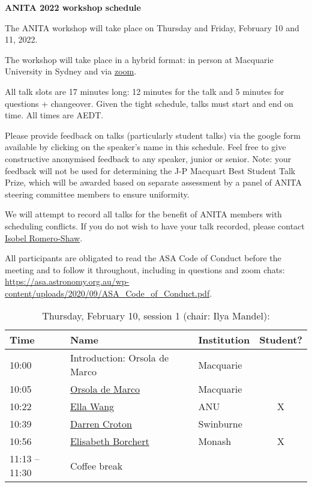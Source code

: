 \documentclass[amsmath,onecolumn]{revtex4-1}
\begin{document}
\begin{center}
{\bf ANITA 2022 workshop schedule}\\
\end{center}
\vspace{0.2in}

The ANITA workshop will take place on Thursday and Friday, February 10 and 11, 2022.

The workshop will take place in a hybrid format: in person at Macquarie University in Sydney and via \href{https://uni-sydney.zoom.us/j/83045235112}{zoom}.  %

All talk slots are 17 minutes long: 12 minutes for the talk and 5 minutes for questions + changeover.  Given the tight schedule, talks must start and end on time.  All times are AEDT.

Please provide feedback on talks (particularly student talks) via the google form available by clicking on the speaker's name in this schedule.  Feel free to give constructive anonymised feedback to any speaker, junior or senior.  Note: your feedback will not be used for determining the J-P Macquart Best Student Talk Prize, which will be awarded based on separate assessment by a panel of ANITA steering committee members to ensure uniformity.

We will attempt to record all talks for the benefit of ANITA members with scheduling conflicts.  If you do not wish to have your talk recorded, please contact \href{mailto:isobel.romero-shaw@monash.edu}{Isobel Romero-Shaw}.

All participants are obligated to read the ASA Code of Conduct before the meeting and to follow it throughout, including in questions and zoom chats:
\url{https://asa.astronomy.org.au/wp-content/uploads/2020/09/ASA_Code_of_Conduct.pdf}.

\FloatBarrier

\begin{table}[!htbp]
	\centering
	\caption{Thursday, February 10, session 1 (chair: Ilya Mandel):}
\begin{tabular}{| l | l | l | c |}
	\hline
	Time & Name  & Institution & Student? \\ 		
	\hline
	10:00 & Introduction: Orsola de Marco & Macquarie & \\
	10:05 & \href{https://forms.gle/ZM8HoYqw1VRShzLNA}{Orsola de Marco} & Macquarie &  \\
	10:22 &  \href{https://forms.gle/bdRTLLNorm3c2uaN7}{Ella Wang} & ANU & X \\
	10:39 &  \href{https://forms.gle/2j1D6zZwaghz1tc26}{Darren Croton} & Swinburne & \\
	10:56 &  \href{https://forms.gle/ZM8HoYqw1VRShzLNA}{Elisabeth Borchert} & Monash & X \\
	11:13 -- 11:30 & Coffee break & & \\
	\hline
\end{tabular}
\end{table}
\end{document}
